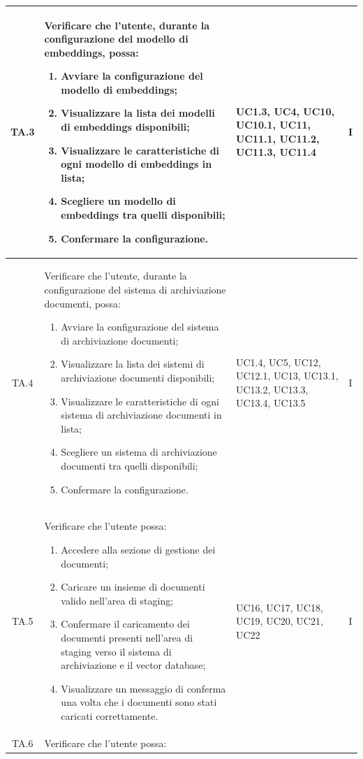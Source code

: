 \documentclass[10pt, a4paper]{article}
\begin{document}
\begin{xltabular}{\textwidth}{|c|X|p{2.5cm}|c|}
\hline
TA.3 & Verificare che l'utente, durante la configurazione del modello di embeddings, possa:
\begin{enumerate}
    \item Avviare la configurazione del modello di embeddings;
    \item Visualizzare la lista dei modelli di embeddings disponibili;
    \item Visualizzare le caratteristiche di ogni modello di embeddings in lista;
    \item Scegliere un modello di embeddings tra quelli disponibili;
    \item Confermare la configurazione.
\end{enumerate}
& UC1.3, UC4, UC10, UC10.1, UC11, UC11.1, UC11.2, UC11.3, UC11.4 & I \\
\hline
TA.4 & Verificare che l'utente, durante la configurazione del sistema di archiviazione documenti, possa:
\begin{enumerate}
    \item Avviare la configurazione del sistema di archiviazione documenti;
    \item Visualizzare la lista dei sistemi di archiviazione documenti disponibili;
    \item Visualizzare le caratteristiche di ogni sistema di archiviazione documenti in lista;
    \item Scegliere un sistema di archiviazione documenti tra quelli disponibili;
    \item Confermare la configurazione.
\end{enumerate}
& UC1.4, UC5, UC12, UC12.1, UC13, UC13.1, UC13.2, UC13.3, UC13.4, UC13.5 & I \\
\hline
TA.5 & Verificare che l'utente possa:
\begin{enumerate}
    \item Accedere alla sezione di gestione dei documenti;
    \item Caricare un insieme di documenti valido nell'area di staging;
    \item Confermare il caricamento dei documenti presenti nell'area di staging verso il sistema di archiviazione e il vector database;
    \item Visualizzare un messaggio di conferma una volta che i documenti sono stati caricati correttamente.
\end{enumerate}
& UC16, UC17, UC18, UC19, UC20, UC21, UC22 & I \\
\hline
TA.6 & Verificare che l'utente possa:

\end{xltabular}
\end{document}
